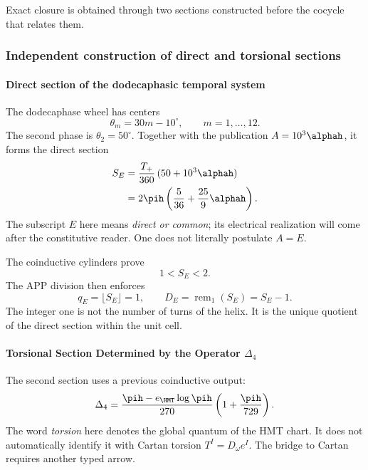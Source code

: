 \noindent Exact closure is obtained through two sections constructed before the cocycle that relates them.\par\medskip

\subsubsection{Independent construction of direct and torsional sections}

\paragraph{Direct section of the dodecaphasic temporal system}

The dodecaphase wheel has centers
\begin{equation}
\theta_m=30m-10^\circ,\qquad m=1,\ldots,12.
\label{eq:rueda-dodecafasica}
\end{equation}
The second phase is \(\theta_2=50^\circ\). Together with the publication
\(A=10^3\alphah\), it forms the direct section
\begin{align}
S_E
&=\frac{T_+}{360}\,(50+10^3\alphah)\\
&=2\pih\left(\frac5{36}+\frac{25}{9}\alphah\right).
\label{eq:seccion-electrica}
\end{align}
The subscript \(E\) here means \emph{direct or common}; its electrical
realization will come after the constitutive reader. One does not literally
postulate \(A=E\).

The coinductive cylinders prove
\begin{equation}
1<S_E<2.
\label{eq:SE-intervalo}
\end{equation}
The APP division then enforces
\begin{equation}
q_E=\lfloor S_E\rfloor=1,
\qquad
D_E=\operatorname{rem}_1(S_E)=S_E-1.
\label{eq:DE}
\end{equation}
The integer one is not the number of turns of the helix. It is the unique quotient of the direct section within the unit cell.

\paragraph{Torsional Section Determined by the Operator \(\Delta_4\)}

The second section uses a previous coinductive output:
\begin{equation}
\Delta_4=
\frac{\pih-e_{\HMT}\log\pih}{270}
\left(1+\frac{\pih}{729}\right).
\label{eq:delta4}
\end{equation}
The word \emph{torsion} here denotes the
global quantum of the HMT chart. It does not automatically identify it
with Cartan torsion \(T^I=D_\omega e^I\). The bridge to Cartan requires another
typed arrow.
